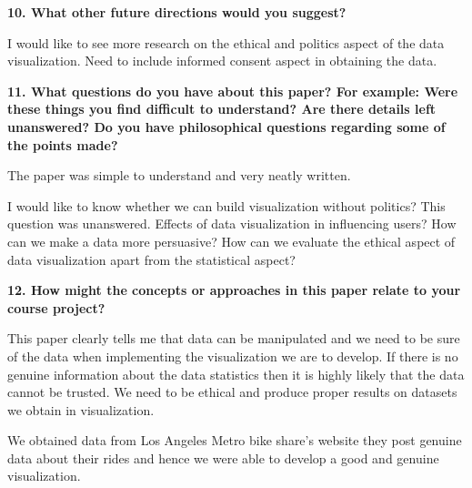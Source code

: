 \documentclass{article}[12pt]
\begin{document}
\vspace{2ex}\noindent
{\bf 10. What other future directions would you suggest? }

{
   I would like to see more research on the ethical and politics aspect of the data visualization. Need to include informed consent aspect in obtaining the data.
   
}

\vspace{2ex}\noindent
{\bf 11. What questions do you have about this paper? For example: Were these things you find difficult to understand? Are there details left unanswered? Do you have philosophical questions regarding some of the points made?}

{
    The paper was simple to understand and very neatly written.
    
    I would like to know whether we can build visualization without politics? This question was unanswered. 
    Effects of data visualization in influencing users? 
    How can we make a data more persuasive?
    How can we evaluate the ethical aspect of data visualization apart from the statistical aspect?
}

\vspace{2ex}\noindent
{\bf 12. How might the concepts or approaches in this paper relate to your course project? }

{
    This paper clearly tells me that data can be manipulated and we need to be sure of the data when implementing the visualization we are to develop. If there is no genuine  information about the data statistics then it is highly likely that the data cannot be trusted. We need to be ethical and produce proper results on datasets we obtain in visualization.
    
    We obtained data from Los Angeles Metro bike share's website they post genuine data about their rides and hence we were able to develop a good and genuine visualization.

}
\end{document}
